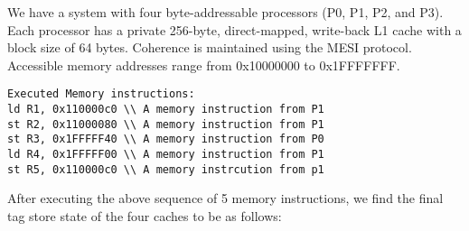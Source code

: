 \noindent We have a system with four byte-addressable processors (P0, P1, P2, and P3). Each processor has
a private 256-byte, direct-mapped, write-back L1 cache with a block size of 64 bytes. Coherence is
maintained using the MESI protocol. Accessible memory addresses range from 0x10000000 to
0x1FFFFFFF.
\begin{verbatim}
Executed Memory instructions:
ld R1, 0x110000c0 \\ A memory instruction from P1
st R2, 0x11000080 \\ A memory instruction from P1
st R3, 0x1FFFFF40 \\ A memory instruction from P0
ld R4, 0x1FFFFF00 \\ A memory instruction from P1
st R5, 0x110000c0 \\ A memory instrcution from p1
\end{verbatim}
After executing the above sequence of 5 memory instructions, we find the final tag store state of the four caches to be as follows:
%
